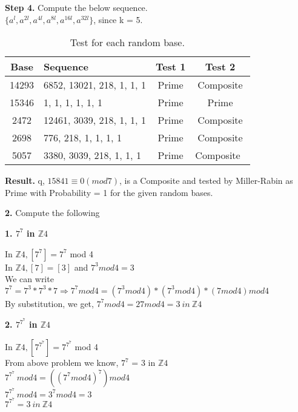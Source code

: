 \documentclass [12pt]{article}
\theoremstyle{definition}
\begin{document}
\phantom{1em} {\bf Step 4.} Compute the below sequence. \\
\phantom{1000em} $\{a^{l}, a^{2l}, a^{4l}, a^{8l}, a^{16l}, a^{32l}\}$, since k = 5.

\begin{table}[h!]
  \begin{center}
    \caption{Test for each random base.}
    \label{tab:Miller-Rabin}
    \begin{tabular}{c|l|c|c} %
      \textbf{Base} & \textbf{Sequence} & \textbf{Test 1} & \textbf{Test 2}\\
      \hline
       14293& 6852, 13021, 218, 1, 1, 1 & Prime & Composite\\
       15346 & 1, 1, 1, 1, 1, 1 & Prime & Prime\\
       2472 & 12461, 3039, 218, 1, 1, 1 & Prime & Composite\\
       2698 & 776, 218, 1, 1, 1, 1 & Prime & Composite\\
       5057 & 3380, 3039, 218, 1, 1, 1 & Prime & Composite\
    \end{tabular}
  \end{center}
\end{table}

\phantom{1em} {\bf Result.} q, $15841 \equiv 0 (mod 7)$, is a Composite and tested by Miller-Rabin as Prime with Probability = 1 for the given random bases. \\

\newpage

{\bf 2.} Compute the following

\phantom{1em} {\bf 1. $7^{7}$  in $ \mathds {Z}4$ }

\phantom{1em} In $ \mathds {Z}4, [7^{7}] =  7^{7} $ mod 4 \\
\phantom{1em} In $ \mathds {Z}4 , [7] = [3] $ and $7^{3}mod 4 = 3$\\
\phantom{1em} We can write $7^{7} = 7^{3} * 7^{3} * 7  \Longrightarrow 7^{7} mod 4 = (7^{3} mod 4) * (7^{3}mod 4) *( 7 mod 4) mod 4$\\
\phantom{1em} By substitution, we get, $7^{7} mod 4 = 27 mod 4 = 3 \ in \ \mathds {Z}4$ 

\phantom{1em} {\bf 2. $7^{7^{7}}$  in $ \mathds {Z}4$ }

\phantom{1em} In $ \mathds {Z}4, [7^{7^{7}}] =  7^{7^{7}} $ mod 4 \\
\phantom{1em} From above problem we know, $7^{7}$ = 3 in $ \mathds {Z}4$ \\
\phantom{1em} $7^{7^{7}} \ mod 4 = ((7^{7} mod 4)^{7}) mod 4$\\
\phantom{1em} $7^{7^{7}} \ mod 4 = 3^{7} mod 4 = 3$\\
\phantom{1em} $7^{7^{7}} = 3 \ in \ \mathds {Z}4$ 
\end{document}
